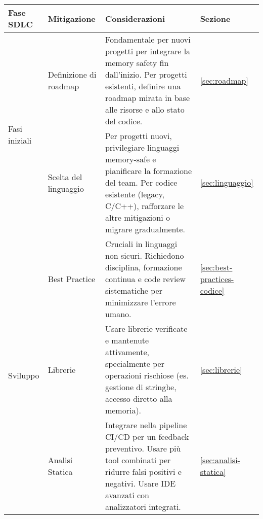 \begin{table}[htbp]
  \centering
  \footnotesize

  \renewcommand{\arraystretch}{1.2}
  \begin{tabular}{|p{2.5cm}|p{2.25cm}|p{8.25cm}|p{2.8cm}|}
    \hline
    \textbf{Fase SDLC}                                                        & \textbf{Mitigazione}                   & \textbf{Considerazioni}                                                                                                                                                                    & \textbf{Sezione}                      \\
    \hline %
    \multirow{2}{2.5cm}{\centering\arraybackslash Fasi iniziali}              & Definizione di roadmap                 & Fondamentale per nuovi progetti per integrare la memory safety fin dall'inizio. Per progetti esistenti, definire una roadmap mirata in base alle risorse e allo stato del codice.          & \autoref{sec:roadmap}                 \\
    \cline{2-4}                                                               & Scelta del linguaggio                  & Per progetti nuovi, privilegiare linguaggi memory-safe e pianificare la formazione del team. Per codice esistente (legacy, C/C++), rafforzare le altre mitigazioni o migrare gradualmente. & \autoref{sec:linguaggio}              \\
    \hline %
    \multirow{3}{2.5cm}{\centering\arraybackslash Sviluppo}                   & Best Practice                          & Cruciali in linguaggi non sicuri. Richiedono disciplina, formazione continua e code review sistematiche per minimizzare l'errore umano.                                                    & \autoref{sec:best-practices-codice}   \\
    \cline{2-4}                                                               & Librerie                               & Usare librerie verificate e mantenute attivamente, specialmente per operazioni rischiose (es. gestione di stringhe, accesso diretto alla memoria).                                         & \autoref{sec:librerie}                \\
    \cline{2-4}                                                               & Analisi Statica                        & Integrare nella pipeline CI/CD per un feedback preventivo. Usare più tool combinati per ridurre falsi positivi e negativi. Usare IDE avanzati con analizzatori integrati.                  & \autoref{sec:analisi-statica}         \\

\end{tabular}
\end{table}
